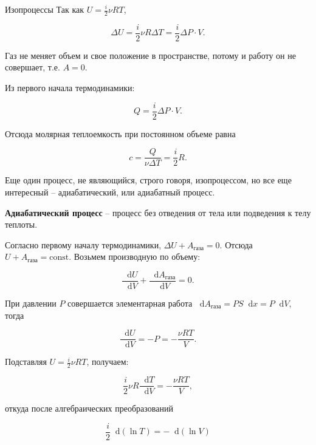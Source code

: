 \documentclass{article}
\newcommand{\definition}[2]{\begin{samepage} \textbf{#1} -- #2. \end{samepage} \par}
\newcommand{\const}{\mathrm{const}}
\renewcommand{\d}{\mathop{}\!\mathrm{d}}
\begin{document}
\begin{section}{Изопроцессы}
		Так как $U = \frac{i}{2} \nu RT$,

		\begin{equation*}
			\Delta U = \frac{i}{2} \nu R \Delta T = \frac{i}{2} \Delta P \cdot V.
		\end{equation*}

		Газ не меняет объем и свое положение в пространстве, потому и работу он не совершает, т.е. $A = 0$.

		Из первого начала термодинамики:

		\begin{equation*}
			Q = \frac{i}{2} \Delta P \cdot V.
		\end{equation*}

		Отсюда молярная теплоемкость при постоянном объеме равна

		\begin{equation*}
			c = \frac{Q}{\nu \Delta T} = \frac{i}{2} R.
		\end{equation*}

		Еще один процесс, не являющийся, строго говоря, изопроцессом, но все еще интересный -- адиабатический, или адиабатный процесс.

		\definition{Адиабатический процесс}{процесс без отведения от тела или подведения к телу теплоты}

		Согласно первому началу термодинамики, $\Delta U + A_{\text{газа}} = 0$. Отсюда $U + A_{\text{газа}} = \const$. Возьмем производную по объему:

		\begin{equation*}
			\frac{\d U}{\d V} + \frac{\d A_{\text{газа}}}{\d V} = 0.
		\end{equation*}

		При давлении $P$ совершается элементарная работа $\d A_{\text{газа}} = PS \d x = P \d V$, тогда

		\begin{equation*}
			\frac{\d U}{\d V} = -P = -\frac{\nu RT}{V}.
		\end{equation*}

		Подставляя $U = \frac{i}{2} \nu RT$, получаем:

		\begin{equation*}
			\frac{i}{2} \nu R \frac{\d T}{\d V} = -\frac{\nu RT}{V},
		\end{equation*}

		откуда после алгебраических преобразований

		\begin{equation*}
			\frac{i}{2} \d (\ln T) = -\d (\ln V)
		\end{equation*}


\end{section}
\end{document}

